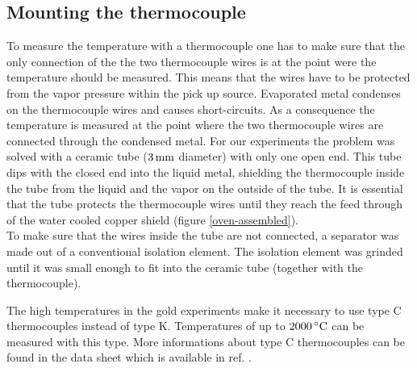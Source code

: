 \documentclass[parskip,12pt,headsepline,a4paper] {scrbook}
\begin{document}
\subsection{Mounting the thermocouple}
\vspace{-1\baselineskip}
To measure the temperature with a thermocouple one has to make sure that the only connection of the the two thermocouple wires is at the point were the temperature should be measured. This means that the wires have to be protected from the vapor pressure within the pick up source. Evaporated metal condenses on the thermocouple wires and causes short-circuits. As a consequence the temperature is measured at the point where the two thermocouple wires are connected through the condensed metal. For our experiments the problem was solved with a ceramic tube ($\unit[3]{mm}$ diameter) with only one open end. This tube dips with the closed end into the liquid metal, shielding the thermocouple inside the tube from the liquid and the vapor on the outside of the tube. It is essential that the tube protects the thermocouple wires until they reach the feed through of the water cooled copper shield (figure \ref{oven-assembled}). \\
To make sure that the wires inside the tube are not connected, a separator was made out of a conventional isolation element. The isolation element was grinded until it was small enough to fit into the ceramic tube (together with the thermocouple).

The high temperatures in the gold experiments make it necessary to use type C thermocouples instead of type K. Temperatures of up to $\unit[2000]{^\circ C}$ can be measured with this type. More informations about type C thermocouples can be found in the data sheet which is available in ref. \cite{ref-typec}. \\
\end{document}
